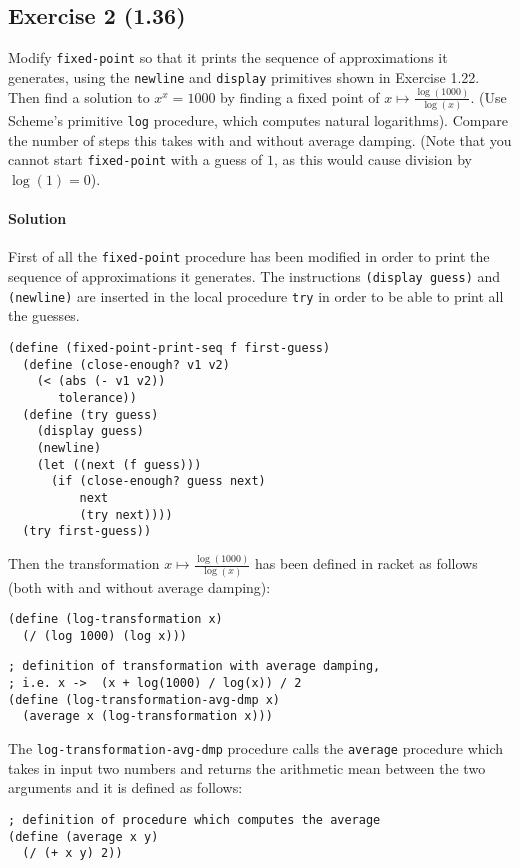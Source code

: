 \subsection*{Exercise 2 (1.36)}
Modify \texttt{fixed-point} so that it prints the sequence of approximations it generates, using the \texttt{newline} and 
\texttt{display} primitives shown in Exercise 1.22. Then find a solution to $ x^{x} = 1000 $ by finding a fixed point of
$ x \mapsto \frac{\log(1000)}{\log(x)} $.
(Use Scheme's primitive \texttt{log} procedure, which computes natural logarithms).
Compare the number of steps this takes with and without average damping.
(Note that you cannot start \texttt{fixed-point} with a guess of $ 1 $, as this would cause division by $ \log(1) = 0 $).

\paragraph{Solution} 
First of all the \texttt{fixed-point} procedure has been modified in order to print the sequence of approximations it generates.
The instructions \texttt{(display guess)} and \texttt{(newline)} are inserted in the local procedure \texttt{try} in order to be
able to print all the guesses.
\begin{lstlisting}[caption={Procedure \texttt{fixed-point} which prints the sequence of approximations it generates},captionpos=b]
(define (fixed-point-print-seq f first-guess)
  (define (close-enough? v1 v2)
    (< (abs (- v1 v2))
       tolerance))
  (define (try guess)
    (display guess)
    (newline)
    (let ((next (f guess)))
      (if (close-enough? guess next)
          next
          (try next))))
  (try first-guess))
\end{lstlisting}
Then the transformation $ x \mapsto \frac{\log(1000)}{\log(x)} $ has been defined in racket as follows 
(both with and without average damping):
\begin{lstlisting}[caption={Transformation without average-damping},captionpos=b]
(define (log-transformation x)
  (/ (log 1000) (log x)))
\end{lstlisting}
\begin{lstlisting}[caption={Transformation with average damping},captionpos=b]
; definition of transformation with average damping, 
; i.e. x ->  (x + log(1000) / log(x)) / 2
(define (log-transformation-avg-dmp x)
  (average x (log-transformation x)))
\end{lstlisting}
The \texttt{log-transformation-avg-dmp} procedure calls the \texttt{average} procedure which takes in input two numbers and returns the
arithmetic mean between the two arguments and it is defined as follows:
\begin{lstlisting}
; definition of procedure which computes the average
(define (average x y) 
  (/ (+ x y) 2))
\end{lstlisting}

